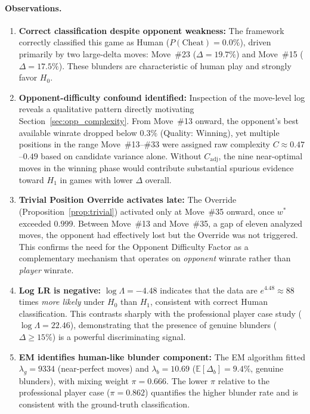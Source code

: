 \documentclass[11pt,a4paper]{article}
\newcommand{\E}{\mathbb{E}}
\begin{document}
\paragraph{Observations.}

\begin{enumerate}
    \item \textbf{Correct classification despite opponent weakness:}
          The framework correctly classified this game as Human
          ($P(\text{Cheat}) = 0.0\%$), driven primarily by two
          large-delta moves: Move~\#23 ($\Delta = 19.7\%$) and
          Move~\#15 ($\Delta = 17.5\%$). These blunders are characteristic
          of human play and strongly favor $H_0$.

    \item \textbf{Opponent-difficulty confound identified:}
          Inspection of the move-level log reveals a qualitative pattern
          directly motivating Section~\ref{sec:opp_complexity}. From
          Move~\#13 onward, the opponent's best available winrate dropped
          below $0.3\%$ (Quality: Winning), yet multiple positions in the
          range Move~\#13--\#33 were assigned raw complexity $C \approx
          0.47$--$0.49$ based on candidate variance alone.
          Without $C_{\text{adj}}$, the nine near-optimal moves in the
          winning phase would contribute substantial spurious evidence
          toward $H_1$ in games with lower $\Delta$ overall.

    \item \textbf{Trivial Position Override activates late:}
          The Override (Proposition~\ref{prop:trivial}) activated only at
          Move~\#35 onward, once $w^*$ exceeded $0.999$. Between Move~\#13
          and Move~\#35, a gap of eleven analyzed moves, the opponent had
          effectively lost but the Override was not triggered. This confirms
          the need for the Opponent Difficulty Factor as a complementary
          mechanism that operates on \emph{opponent} winrate rather than
          \emph{player} winrate.

    \item \textbf{Log LR is negative:}
          $\log \Lambda = -4.48$ indicates that the data are $e^{4.48}
          \approx 88$ times \emph{more likely} under $H_0$ than $H_1$,
          consistent with correct Human classification. This contrasts
          sharply with the professional player case study ($\log \Lambda =
          22.46$), demonstrating that the presence of genuine blunders
          ($\Delta \geq 15\%$) is a powerful discriminating signal.

    \item \textbf{EM identifies human-like blunder component:}
          The EM algorithm fitted $\lambda_g = 9334$ (near-perfect moves)
          and $\lambda_b = 10.69$ ($\E[\Delta_b] = 9.4\%$, genuine blunders),
          with mixing weight $\pi = 0.666$. The lower $\pi$ relative to the
          professional player case ($\pi = 0.862$) quantifies the higher
          blunder rate and is consistent with the ground-truth classification.
\end{enumerate}
\end{document}
